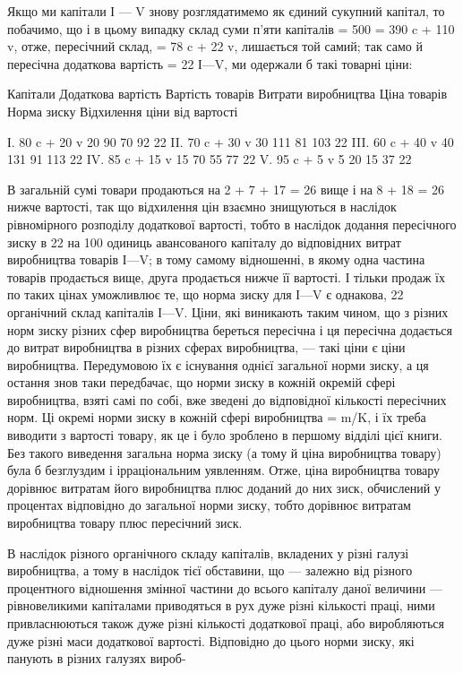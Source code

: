 Якщо ми капітали І — V знову розглядатимемо як єдиний сукупний капітал, то побачимо, що і в цьому
випадку склад суми
п’яти капіталів = 500 = 390 c + 110 v, отже, пересічний склад, = 78 c + 22 v, лишається той самий;
так само й пересічна додаткова вартість = 22%
І—V, ми одержали б такі товарні ціни:

Капітали
Додаткова вартість
Вартість товарів
Витрати виробництва
Ціна товарів
Норма зиску
Відхилення ціни від вартості

І. 80 c + 20 v    20    90    70    92    22%
II. 70 c + 30 v   30   111   81   103   22%
III. 60 c + 40 v  40   131   91   113   22%
IV. 85 c + 15 v   15    70    55    77    22%
V. 95 c + 5 v        5     20    15    37    22%

В загальній сумі товари продаються на 2 + 7 + 17 = 26 вище і
на 8 + 18 = 26 нижче вартості, так що відхилення цін взаємно
знищуються в наслідок рівномірного розподілу додаткової вартості, тобто в наслідок додання
пересічного зиску в 22 на
100 одиниць авансованого капіталу до відповідних витрат виробництва товарів І—V; в тому самому
відношенні, в якому одна
частина товарів продається вище, друга продається нижче її
вартості. І тільки продаж їх по таких цінах уможливлює те, що
норма зиску для І—V є однакова, 22%
органічний склад капіталів І—V. Ціни, які виникають таким чином, що з різних норм зиску різних сфер
виробництва береться
пересічна і ця пересічна додається до витрат виробництва в різних сферах виробництва, — такі ціни є
ціни виробництва. Передумовою їх є існування однієї загальної норми зиску, а ця
остання знов таки передбачає, що норми зиску в кожній окремій сфері виробництва, взяті самі по собі,
вже зведені до
відповідної кількості пересічних норм. Ці окремі норми зиску в кожній сфері виробництва = m/K, і їх
треба виводити з вартості товару, як це і було зроблено в першому відділі цієї книги. Без такого
виведення загальна норма зиску (а тому й ціна виробництва товару) була б безглуздим і ірраціональним
уявленням. Отже, ціна виробництва товару дорівнює витратам його
виробництва плюс доданий до них зиск, обчислений у процентах
відповідно до загальної норми зиску, тобто дорівнює витратам
виробництва товару плюс пересічний зиск.

В наслідок різного органічного складу капіталів, вкладених
у різні галузі виробництва, а тому в наслідок тієї обставини,
що — залежно від різного процентного відношення змінної частини до всього капіталу даної величини —
рівновеликими капіталами приводяться в рух дуже різні кількості праці, ними привласнюються також
дуже різні кількості додаткової праці, або
виробляються дуже різні маси додаткової вартості. Відповідно
до цього норми зиску, які панують в різних галузях вироб-
